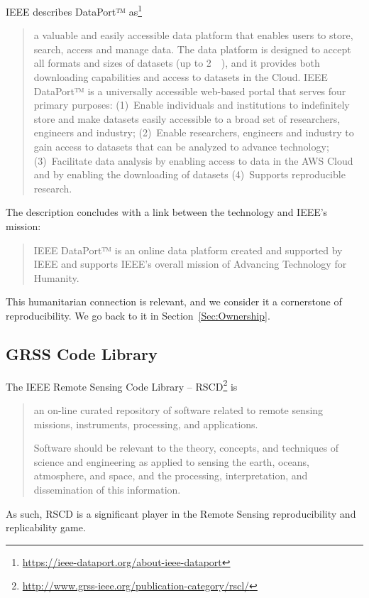 \documentclass[journal,twoside]{IEEEtran}
\begin{document}
IEEE describes DataPort™ as\footnote{\url{https://ieee-dataport.org/about-ieee-dataport}} 
\begin{quote}
	a valuable and easily accessible data platform that enables users to store, search, access and manage data.  
	The data platform is designed to accept all formats and sizes of datasets (up to \SI{2}{\tera\byte}), and it provides both downloading capabilities and access to datasets in the Cloud.  
	IEEE DataPort™ is a universally accessible web-based portal that serves four primary purposes: 
	(1)~Enable individuals and institutions to indefinitely store and make datasets easily accessible to a broad set of researchers, engineers and industry;  
	(2)~Enable researchers, engineers and industry to gain access to datasets that can be analyzed to advance technology;
	(3)~Facilitate data analysis by enabling access to data in the AWS Cloud and by enabling the downloading of datasets
	(4)~Supports reproducible research.
\end{quote}

The description concludes with a link between the technology and IEEE's mission:
\begin{quote}
	IEEE DataPort™ is an online data platform created and supported by IEEE and supports IEEE’s overall mission of Advancing Technology for Humanity.  
\end{quote}
This humanitarian connection is relevant, and we consider it a cornerstone of reproducibility.
We go back to it in Section~\ref{Sec:Ownership}.


\subsection{GRSS Code Library}

The IEEE Remote Sensing Code Library -- RSCD\footnote{\url{http://www.grss-ieee.org/publication-category/rscl/}} is 
\begin{quote}
	an on-line curated repository of software related to remote sensing missions, instruments, processing, and applications.
	
	Software should be relevant to the theory, concepts, and techniques of science and engineering as applied to sensing the earth, oceans, atmosphere, and space, and the processing, interpretation, and dissemination of this information.
\end{quote}

As such, RSCD is a significant player in the Remote Sensing reproducibility and replicability game.
\end{document}
